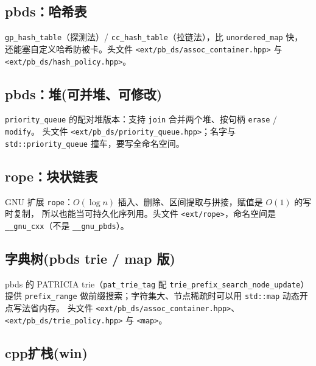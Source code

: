\documentclass[11pt,a4paper,twocolumn]{ctexart}  %
\begin{document}
\subsection{pbds：哈希表}
\texttt{gp\_hash\_table}（探测法）/ \texttt{cc\_hash\_table}（拉链法），比 \texttt{unordered\_map} 快，
还能塞自定义哈希防被卡。头文件 \texttt{<ext/pb\_ds/assoc\_container.hpp>} 与 \texttt{<ext/pb\_ds/hash\_policy.hpp>}。


\subsection{pbds：堆(可并堆、可修改)}
\texttt{priority\_queue} 的配对堆版本：支持 \texttt{join} 合并两个堆、按句柄 \texttt{erase} / \texttt{modify}。
头文件 \texttt{<ext/pb\_ds/priority\_queue.hpp>}；名字与 \texttt{std::priority\_queue} 撞车，要写全命名空间。


\subsection{rope：块状链表}
GNU 扩展 \texttt{rope}：$O(\log n)$ 插入、删除、区间提取与拼接，赋值是 $O(1)$ 的写时复制，
所以也能当可持久化序列用。头文件 \texttt{<ext/rope>}，命名空间是 \texttt{\_\_gnu\_cxx}（不是 \texttt{\_\_gnu\_pbds}）。


\subsection{字典树(pbds trie / map 版)}
pbds 的 PATRICIA trie（\texttt{pat\_trie\_tag} 配 \texttt{trie\_prefix\_search\_node\_update}）
提供 \texttt{prefix\_range} 做前缀搜索；字符集大、节点稀疏时可以用 \texttt{std::map} 动态开点写法省内存。
头文件 \texttt{<ext/pb\_ds/assoc\_container.hpp>}、\texttt{<ext/pb\_ds/trie\_policy.hpp>} 与 \texttt{<map>}。


\subsection{cpp扩栈(win)}

\end{document}
